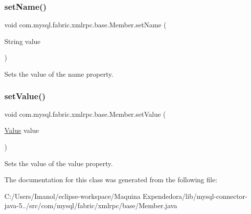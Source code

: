 \subsubsection{\texorpdfstring{set\+Name()}{setName()}}
{\footnotesize\ttfamily void com.\+mysql.\+fabric.\+xmlrpc.\+base.\+Member.\+set\+Name (\begin{DoxyParamCaption}\item[{String}]{value }\end{DoxyParamCaption})}

Sets the value of the name property. \mbox{\label{classcom_1_1mysql_1_1fabric_1_1xmlrpc_1_1base_1_1_member_af953552bee1c2af80d3d4fba98f02088}} 
\subsubsection{\texorpdfstring{set\+Value()}{setValue()}}
{\footnotesize\ttfamily void com.\+mysql.\+fabric.\+xmlrpc.\+base.\+Member.\+set\+Value (\begin{DoxyParamCaption}\item[{\mbox{\hyperlink{classcom_1_1mysql_1_1fabric_1_1xmlrpc_1_1base_1_1_value}{Value}}}]{value }\end{DoxyParamCaption})}

Sets the value of the value property. 

The documentation for this class was generated from the following file\+:\begin{DoxyCompactItemize}
\item 
C\+:/\+Users/\+Imanol/eclipse-\/workspace/\+Maquina Expendedora/lib/mysql-\/connector-\/java-\/5../src/com/mysql/fabric/xmlrpc/base/Member.\+java\end{DoxyCompactItemize}
